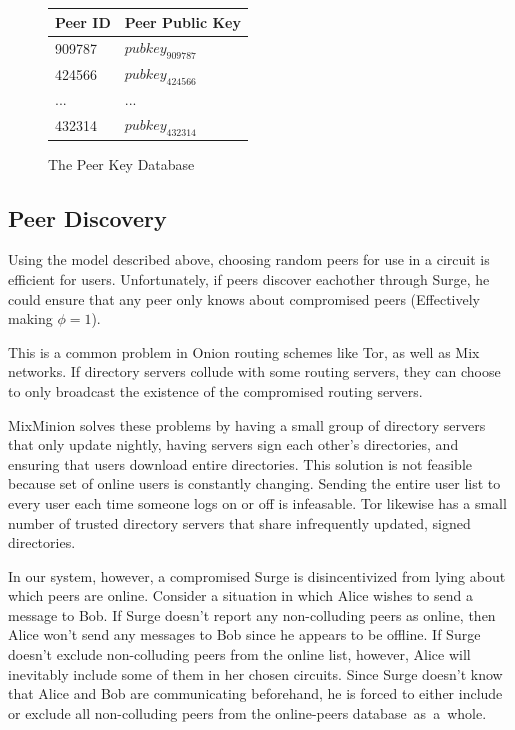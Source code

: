 \documentclass[twocolumn,11pt,english]{article}
\begin{document}
\begin{figure}[ht]
  \centering
\begin{tabular}{| l | l | }
  \hline
  Peer ID & Peer Public Key  \\ \hline
  909787 & $pubkey_{909787}$ \\ \hline
  424566 & $pubkey_{424566}$ \\ \hline
  ... & ... \\ \hline
  432314 & $pubkey_{432314}$  \\ \hline
\end{tabular}
\caption{The Peer Key Database}
\label{peerKeyDB}
\end{figure}

\subsection{Peer Discovery}
\label{sec:PeerDiscovery}
Using the model described above, choosing random peers for use in a circuit is efficient for users.  Unfortunately, if peers discover eachother through Surge, he could ensure that any peer only knows about compromised peers (Effectively making $\phi = 1$).

This is a common problem in Onion routing schemes like Tor, as well as Mix networks. If directory servers collude with some routing servers, they can choose to only broadcast the existence of the compromised routing servers.

MixMinion \cite{minion-design} solves these problems by having a small group of directory servers that only update nightly, having servers sign each other's directories, and ensuring that users download entire directories. This solution is not feasible because set of online users is constantly changing. Sending the entire user list to every user each time someone logs on or off is infeasable. Tor \cite{tor-design} likewise has a small number of trusted directory servers that share infrequently updated, signed directories.

In our system, however, a compromised Surge is disincentivized from lying about which peers are online. Consider a situation in which Alice wishes to send a message to Bob. If Surge doesn't report any non-colluding peers as online, then Alice won't send any messages to Bob since he appears to be offline. If Surge doesn't exclude non-colluding peers from the online list, however, Alice will inevitably include some of them in her chosen circuits. Since Surge doesn't know that Alice and Bob are communicating beforehand, he is forced to either include or exclude all non-colluding peers from the online-peers database~as~a~whole. 
\end{document}
